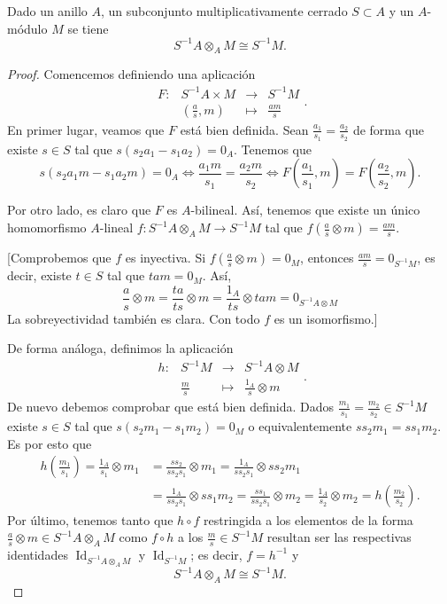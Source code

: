 \documentclass[../main.tex]{subfiles}
\begin{document}
	\begin{proposition}Dado un anillo $A$, un subconjunto multiplicativamente cerrado $S\subset A$ y un $A$-módulo $M$ se tiene
		$$S^{-1}A\otimes_AM\cong S^{-1}M.$$
	\end{proposition}
	\begin{proof}
		Comencemos definiendo una aplicación
		$$\begin{array}{rrcl}
		F:&S^{-1}A\times M&\longrightarrow&S^{-1}M\\
		&(\frac{a}{s},m)&\longmapsto&\frac{am}{s}
		\end{array}.$$
		En primer lugar, veamos que $F$ está bien definida. Sean $\frac{a_1}{s_1}=\frac{a_2}{s_2}$ de forma que existe $s\in S$ tal que $s(s_2a_1-s_1a_2)=0_A$. Tenemos que
		$$s(s_2a_1m-s_1a_2m)=0_A\Longleftrightarrow \frac{a_1m}{s_1}=\frac{a_2m}{s_2}\Longleftrightarrow F\left(\frac{a_1}{s_1},m\right)=F\left(\frac{a_2}{s_2},m\right).$$

		Por otro lado, es claro que $F$ es $A$-bilineal. Así, tenemos que existe un único homomorfismo $A$-lineal $f: S^{-1}A\otimes_AM\longrightarrow S^{-1}M$ tal que $f(\frac{a}{s}\otimes m)=\frac{am}{s}$.

		[Comprobemos que $f$ es inyectiva. Si $f(\frac{a}{s}\otimes m)=0_M$, entonces $\frac{am}{s}=0_{S^{-1}M}$, es decir, existe $t\in S$ tal que $tam=0_M$. Así,
		$$\frac{a}{s}\otimes m=\frac{ta}{ts}\otimes m=\frac{1_A}{ts}\otimes tam=0_{S^{-1}A\otimes M}$$
		La sobreyectividad también es clara. Con todo $f$ es un isomorfismo.]

		De forma análoga, definimos la aplicación
		$$\begin{array}{rrcl}
		h:&S^{-1}M&\longrightarrow&S^{-1}A\otimes M\\
		&\frac{m}{s}&\longmapsto&\frac{1_A}{s}\otimes m
		\end{array}.$$
		De nuevo debemos comprobar que está bien definida. Dados $\frac{m_1}{s_1}=\frac{m_2}{s_2}\in S^{-1}M$ existe $s\in S$ tal que $s(s_2m_1-s_1m_2)=0_M$ o equivalentemente $ss_2m_1=ss_1m_2$. Es por esto que
		\begin{align*}
		h\left(\frac{m_1}{s_1}\right)=\frac{1_A}{s_1}\otimes m_1&=\frac{ss_2}{ss_2s_1}\otimes m_1=\frac{1_A}{ss_2s_1}\otimes ss_2m_1\\
		&=\frac{1_A}{ss_2s_1}\otimes ss_1m_2=\frac{ss_1}{ss_2s_1}\otimes m_2=\frac{1_A}{s_2}\otimes m_2=h\left(\frac{m_2}{s_2}\right).
		\end{align*}
		Por último, tenemos tanto que $h\circ f$ restringida a los elementos de la forma $\frac{a}{s}\otimes m\in S^{-1}A\otimes_A M$ como $f\circ h$ a los $\frac{m}{s}\in S^{-1}M$ resultan ser las respectivas identidades $\operatorname{Id}_{S^{-1}A\otimes_A M}$ y $\operatorname{Id}_{S^{-1}M}$; es decir, $f=h^{-1}$ y $$S^{-1}A\otimes_A M\cong S^{-1}M.$$
	\end{proof}
\end{document}
